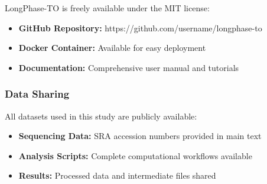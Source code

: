 \documentclass[pdflatex,sn-nature]{sn-jnl}
\begin{document}
LongPhase-TO is freely available under the MIT license:
\begin{itemize}
\item \textbf{GitHub Repository:} https://github.com/username/longphase-to
\item \textbf{Docker Container:} Available for easy deployment
\item \textbf{Documentation:} Comprehensive user manual and tutorials
\end{itemize}

\subsubsection{Data Sharing}

All datasets used in this study are publicly available:
\begin{itemize}
\item \textbf{Sequencing Data:} SRA accession numbers provided in main text
\item \textbf{Analysis Scripts:} Complete computational workflows available
\item \textbf{Results:} Processed data and intermediate files shared
\end{itemize}
\end{document}
